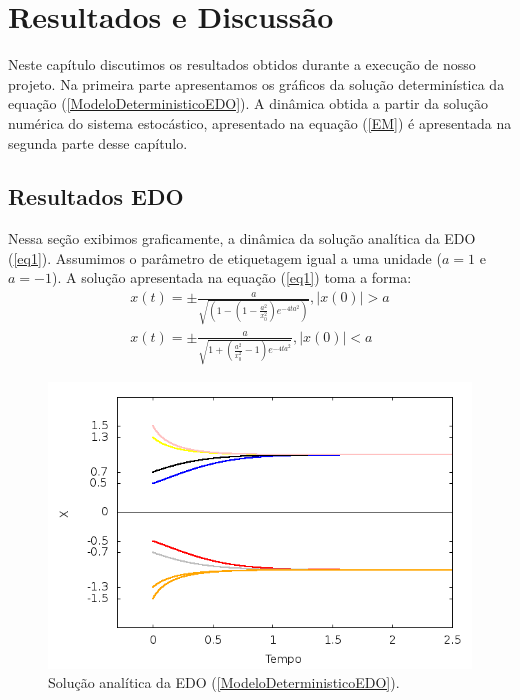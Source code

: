 \chapter{Resultados e Discussão}
Neste capítulo discutimos os resultados obtidos durante a execução de nosso projeto. Na primeira parte apresentamos os gráficos da solução determinística da equação (\ref{ModeloDeterministicoEDO}). A dinâmica obtida a partir da solução numérica do sistema estocástico, apresentado na equação (\ref{EM}) é apresentada na segunda parte desse capítulo. 

\section{Resultados EDO}
Nessa seção exibimos graficamente, a dinâmica da solução analítica da EDO (\ref{eq1}). Assumimos o parâmetro de etiquetagem igual a uma unidade ($a = 1 $ e $ a = -1$). A solução apresentada na equação (\ref{eq1}) toma a forma:
\begin{eqnarray}\label{eq11111}
x(t) = \pm \frac{a}{\sqrt{(1- (1-\frac{a^{2}}{x_{0}^{2}}) e^{-4ta^{2}})}} , |x(0)| > a \\
x(t) = \pm \frac{a}{\sqrt{1+(\frac{a^{2}}{x_{0}^{2}} - 1)e^{-4ta^{2}}}} , |x(0)| < a
\end{eqnarray}
\begin{figure}[!htb]
\centering
\begin{minipage}[b]{0.9\linewidth}
\includegraphics[width=\linewidth]{./img/analiseAssimptotica.png}
\caption{Solução analítica da EDO (\ref{ModeloDeterministicoEDO}).}
\label{fig0}
\end{minipage} \hfill
\end{figure}
